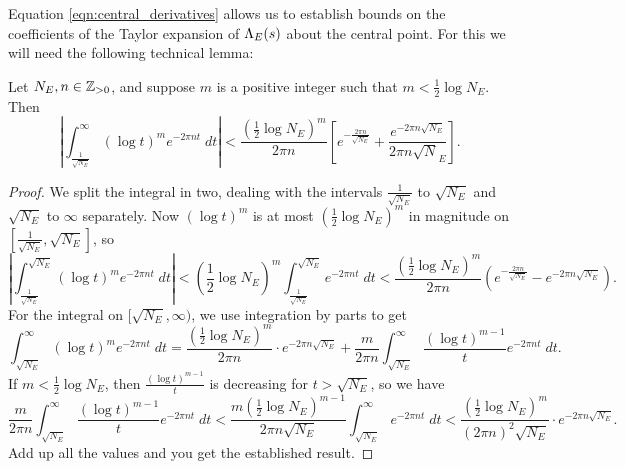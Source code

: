 Equation \ref{eqn:central_derivatives} allows us to establish bounds on the coefficients of the Taylor expansion of $\Lambda_E(s)$ about the central point. For this we will need the following technical lemma:
\begin{lemma}\label{lem:central_deriv_int_bounds}
Let $N_E,n \in \mathbb{Z}_{>0}$, and suppose $m$ is a positive integer such that $m < \frac{1}{2}\log N_E$. Then
\begin{equation}
\left| \int_{\frac{1}{\sqrt{N_E}}}^{\infty} (\log t)^{m} e^{-2\pi n t} \; dt \right| < \frac{\left(\frac{1}{2} \log N_E\right)^{m}}{2\pi n}\left[ e^{-\frac{2\pi n}{\sqrt{N_E}}} + \frac{e^{-2\pi n\sqrt{N_E}}}{2\pi n \sqrt N_E} \right].
\end{equation}
\end{lemma}
\begin{proof}
We split the integral in two, dealing with the intervals $\frac{1}{\sqrt{N_E}}$ to $\sqrt{N_E}$ and $\sqrt{N_E}$ to $\infty$ separately. Now $(\log t)^{m}$ is at most $(\frac{1}{2}\log N_E)^m$ in magnitude on $[\frac{1}{\sqrt{N_E}},\sqrt{N_E}]$, so
\begin{equation*}
\left| \int_{\frac{1}{\sqrt{N_E}}}^{\sqrt{N_E}} (\log t)^{m} e^{-2\pi n t} \; dt \right| < \left(\frac{1}{2} \log N_E\right)^m \int_{\frac{1}{\sqrt{N_E}}}^{\sqrt{N_E}} e^{-2\pi n t} \; dt < \frac{\left(\frac{1}{2} \log N_E\right)^{m}}{2\pi n}\left(e^{-\frac{2\pi n}{\sqrt{N_E}}} - e^{-2\pi n\sqrt{N_E}}\right).
\end{equation*}
For the integral on $[\sqrt{N_E},\infty)$, we use integration by parts to get
\begin{equation*}
\int_{\sqrt{N_E}}^{\infty} \left(\log t \right)^{m} e^{-2\pi n t} \; dt = \frac{\left(\frac{1}{2} \log N_E\right)^{m}}{2\pi n}\cdot e^{-2\pi n\sqrt{N_E}} + \frac{m}{2\pi n} \int_{\sqrt{N_E}}^{\infty} \frac{\left(\log t \right)^{m-1}}{t} e^{-2\pi n t} \; dt.
\end{equation*}
If $m < \frac{1}{2}\log N_E$, then $\frac{\left(\log t \right)^{m-1}}{t}$ is decreasing for $t > \sqrt{N_E}$, so we have
\begin{equation*}
\frac{m}{2\pi n} \int_{\sqrt{N_E}}^{\infty} \frac{\left(\log t \right)^{m-1}}{t} e^{-2\pi n t} \; dt < \frac{m\left(\frac{1}{2} \log N_E\right)^{m-1}}{2\pi n\sqrt{N_E}} \int_{\sqrt{N_E}}^{\infty} e^{-2\pi n t} \; dt < \frac{\left(\frac{1}{2} \log N_E\right)^{m}}{(2\pi n)^2 \sqrt{N_E}} \cdot e^{-2\pi n \sqrt{N_E}}.
\end{equation*}
Add up all the values and you get the established result.
\end{proof}

